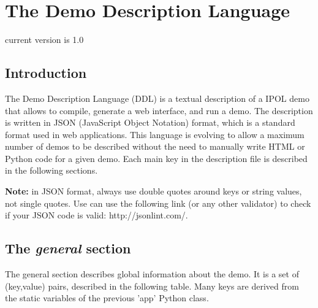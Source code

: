 \section{The Demo Description Language}

current version is 1.0

\subsection{Introduction}
The Demo Description Language (DDL) is a textual description of a IPOL demo that 
allows to compile, generate a web interface, and run a demo. The description is 
written in JSON (JavaScript Object Notation) format, which is a standard format 
used in web applications. This language is evolving to allow a maximum number 
of demos to be described without the need to manually write HTML or Python code 
for a given demo. Each main key in the description file is described in the 
following sections.


{\bf Note:} in JSON format, always use double quotes around keys or string 
values, not single quotes. Use can use the following link (or any other validator)
to check if your JSON code is valid: http://jsonlint.com/.



\subsection{The \emph{general} section}
The general section describes global information about the demo. It is a set of 
(key,value) pairs, described in the following table. Many keys are derived from 
the static variables of the previous 'app' Python class.

